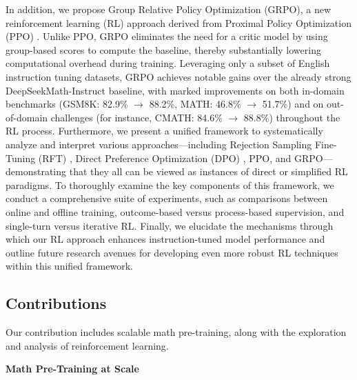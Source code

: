 In addition, we propose Group Relative Policy Optimization (GRPO), a new reinforcement learning (RL) approach derived from Proximal Policy Optimization (PPO) \citep{schulman2017proximal}. Unlike PPO, GRPO eliminates the need for a critic model by using group-based scores to compute the baseline, thereby substantially lowering computational overhead during training. Leveraging only a subset of English instruction tuning datasets, GRPO achieves notable gains over the already strong DeepSeekMath-Instruct baseline, with marked improvements on both in-domain benchmarks (GSM8K: 82.9\% $\rightarrow$ 88.2\%, MATH: 46.8\% $\rightarrow$ 51.7\%) and on out-of-domain challenges (for instance, CMATH: 84.6\% $\rightarrow$ 88.8\%) throughout the RL process. Furthermore, we present a unified framework to systematically analyze and interpret various approaches—including Rejection Sampling Fine-Tuning (RFT) \citep{yuan2023scaling}, Direct Preference Optimization (DPO) \citep{dpo}, PPO, and GRPO—demonstrating that they all can be viewed as instances of direct or simplified RL paradigms. To thoroughly examine the key components of this framework, we conduct a comprehensive suite of experiments, such as comparisons between online and offline training, outcome-based versus process-based supervision, and single-turn versus iterative RL. Finally, we elucidate the mechanisms through which our RL approach enhances instruction-tuned model performance and outline future research avenues for developing even more robust RL techniques within this unified framework.

\subsection{Contributions}
Our contribution includes scalable math pre-training, along with the exploration and analysis of reinforcement learning.

\textbf{Math Pre-Training at Scale}


